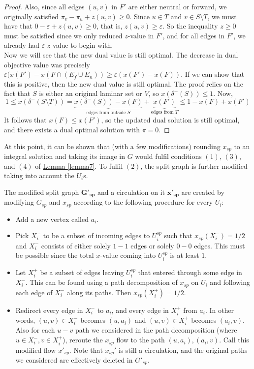 \documentclass[./main.tex]{subfiles}
\begin{document}
\begin{proof}
			Also, since all edges $(u,v)$ in $F'$ are either neutral or forward, we originally satisfied $\pi_v - \pi_u + z(u,v)\geqslant 0$. Since $u\in T$ and $v\in S\setminus T$, we must have that $0 - \varepsilon + z(u,v)\geqslant 0$, that is, $z(u,v)\geqslant \varepsilon$. 
	So the inequality $z\geqslant 0$ must be satisfied since we only reduced $z$-value in $F'$, and for all edges in $F'$, we already had $\varepsilon$ $z$-value to begin with.\vspace{2mm}
	\\Now we will see that the new dual value is still optimal. 
	The decrease in dual objective value was precisely $\varepsilon (x(F') - x(F\cap( E_f\cup E_n))\geqslant \varepsilon(x(F') - x(F))$. If we can show that this is positive, then the new dual value is still optimal. The proof relies on the fact that $S$ is either an original laminar set or $V$, so $x(\delta^-(S))\leqslant 1$. Now, $$1\leqslant x(\delta^-(S\setminus T)) = \underbrace{x(\delta^-(S)) - x(F)}_{\text{edges from outside } S} + \underbrace{x(F')}_{\text{edges from } T}\leqslant 1 - x(F) + x(F')$$
	It follows that $x(F)\leqslant x(F')$, so the updated dual solution is still optimal, and there exists a dual optimal solution with $\pi = 0$.
		\end{proof}
		At this point, it can be shown that (with a few modifications) rounding $x_{sp}$ to an integral solution and taking its image in $G$ would fulfil conditions $(1)$, $(3)$, and $(4)$ of \hyperref[lemma7]{Lemma \ref{lemma7}}. To fulfil $(2)$, the split graph is further modified taking into account the $U_i$s.\vspace{2mm}
		\begin{definition}\label{def:6.1}
			The modified split graph $\bm{G'_{sp}}$ and a circulation on it $\bm{x'_{sp}}$ are created by modifying $G_{sp}$ and $x_{sp}$ according to the following procedure for every $U_i$:
			\begin{itemize}[-]
			\item Add a new vertex called $a_i$.
			\item Pick $X_i^-$ to be a subset of incoming edges to $U_i^{sp}$ such that $x_{sp}(X_i^-) = 1/2$ and $X_i^-$ consists of either solely $1-1$ edges or solely $0-0$ edges. This must be possible since the total $x$-value coming into $U_i^{sp}$ is at least $1$.
			\item Let $X_i^+$ be a subset of edges leaving $U_i^{sp}$ that entered through some edge in $X_i^-$. This can be found using a path decomposition of $x_{sp}$ on $U_i$ and following each edge of $X_i^-$ along its paths. Then $x_{sp}(X_i^+) = 1/2$.
			\item Redirect every edge in $X_i^-$ to $a_i$, and every edge in $X_i^+$ from $a_i$. In other words, $(u,v)\in X_i^-$ becomes $(u,a_i)$ and $(u,v)\in X_i^+$ becomes $(a_i, v)$. Also for each $u-v$ path we considered in the path decomposition (where $u\in X_i^-, v\in X_i^+$), reroute the $x_{sp}$ flow to the path $(u,a_i),(a_i,v)$. Call this modified flow $x'_{sp}$. Note that $x_{sp}'$ is still a circulation, and the original paths we considered are effectively deleted in $G'_{sp}$.
			\end{itemize}
		\end{definition}
\end{document}
